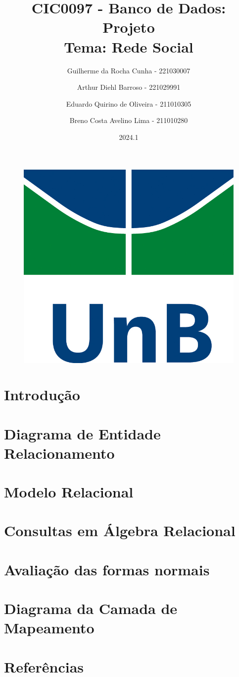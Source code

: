 \documentclass{article}
\title{CIC0097 - Banco de Dados: Projeto \\
        \large \textbf{Tema:} Rede Social}
\author{Guilherme da Rocha Cunha - 221030007 \\
        \and
        Arthur Diehl Barroso - 221029991 \\
        \and
        Eduardo Quirino de Oliveira - 211010305 \\
        \and 
        Breno Costa Avelino Lima - 211010280}
\date{2024.1}
\begin{document}
\pagestyle{fancy}

\maketitle

\begin{figure}[ht]
        \centering
        \includegraphics[width=.5\textwidth]{imagens/logo_unb.jpg}
\end{figure}

\newpage

\fancyhead{}
\fancyfoot[C]{\thepage}


\renewcommand*\contentsname{Sumário}
\tableofcontents

\newpage

\section{Introdução}

\section{Diagrama de Entidade Relacionamento}

\section{Modelo Relacional}

\section{Consultas em Álgebra Relacional}

\section{Avaliação das formas normais}

\section{Diagrama da Camada de Mapeamento}

\section{Referências}
\end{document}
